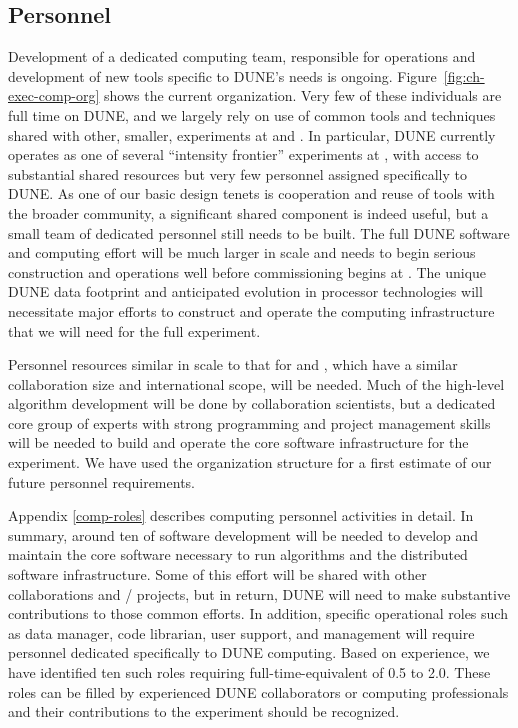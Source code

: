\subsection{Personnel}


Development of a  dedicated  computing team, responsible for operations and development of new tools specific to DUNE's needs is ongoing. 
Figure~\ref{fig:ch-exec-comp-org} shows the current organization.  Very few of these individuals are full time on DUNE, and we largely rely on use of common tools and techniques shared with other, smaller, experiments at  and . In particular, DUNE currently operates as one of several ``intensity frontier'' experiments at , with access to substantial shared resources but very few personnel assigned specifically to DUNE.  As one of our basic design tenets is cooperation and reuse of tools with the broader community, a significant shared component is indeed useful, but a small team of dedicated personnel still needs to be built. 
The full DUNE software and computing effort will be much larger in scale and needs to begin serious construction and operations well before commissioning begins at . The unique DUNE data footprint and anticipated evolution in processor technologies will necessitate major efforts to construct and operate the computing infrastructure that we will need for the full experiment.

Personnel resources similar in scale to that for  and , which have a similar collaboration size and international scope, will be needed.  
Much of the high-level algorithm development will be done by collaboration scientists, but a dedicated core group of experts with strong programming and project management skills will be needed to build and operate the core software infrastructure for the experiment.  We have used the  organization structure for a first estimate of our future personnel requirements.

Appendix \ref{comp-roles} describes  computing personnel activities in detail.  In summary, around ten  of software development will be needed to develop and maintain the core software necessary to run  algorithms and the distributed software infrastructure.  Some of this effort will be shared with other collaborations and / projects, but in return, DUNE will need to make substantive contributions to those common efforts. In addition, %
specific operational roles such as data manager, code librarian, user support, and management %
will require personnel dedicated specifically to DUNE computing. Based on  experience, we have identified ten such roles 
requiring full-time-equivalent  of 0.5 to 2.0.  These roles can be filled by experienced DUNE collaborators or computing professionals and their contributions to the experiment should be  recognized. 



